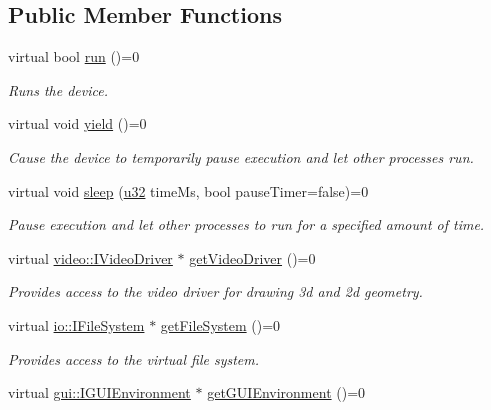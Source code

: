 \subsection*{Public Member Functions}
\begin{DoxyCompactItemize}
\item 
virtual bool \hyperlink{classirr_1_1IrrlichtDevice_a0489f8151dc43f6f41503ffb5a160b35}{run} ()=0
\begin{DoxyCompactList}\small\item\em Runs the device. \end{DoxyCompactList}\item 
virtual void \hyperlink{classirr_1_1IrrlichtDevice_a731727774fad9fc4c6c1c85277ca36dc}{yield} ()=0
\begin{DoxyCompactList}\small\item\em Cause the device to temporarily pause execution and let other processes run. \end{DoxyCompactList}\item 
virtual void \hyperlink{classirr_1_1IrrlichtDevice_a89a3ecebc0e7c5ae08617b78a6e8a9f7}{sleep} (\hyperlink{namespaceirr_a0416a53257075833e7002efd0a18e804}{u32} time\+Ms, bool pause\+Timer=false)=0
\begin{DoxyCompactList}\small\item\em Pause execution and let other processes to run for a specified amount of time. \end{DoxyCompactList}\item 
virtual \hyperlink{classirr_1_1video_1_1IVideoDriver}{video\+::\+I\+Video\+Driver} $\ast$ \hyperlink{classirr_1_1IrrlichtDevice_ada90707ba5c645d47e000e4e0f87c4c4}{get\+Video\+Driver} ()=0
\begin{DoxyCompactList}\small\item\em Provides access to the video driver for drawing 3d and 2d geometry. \end{DoxyCompactList}\item 
virtual \hyperlink{classirr_1_1io_1_1IFileSystem}{io\+::\+I\+File\+System} $\ast$ \hyperlink{classirr_1_1IrrlichtDevice_a3d8d2dee2f57aa7e6c0d14592de3e6ed}{get\+File\+System} ()=0
\begin{DoxyCompactList}\small\item\em Provides access to the virtual file system. \end{DoxyCompactList}\item 
virtual \hyperlink{classirr_1_1gui_1_1IGUIEnvironment}{gui\+::\+I\+G\+U\+I\+Environment} $\ast$ \hyperlink{classirr_1_1IrrlichtDevice_af7491b8c5ef4f71360f30fbad90ae35c}{get\+G\+U\+I\+Environment} ()=0

\end{DoxyCompactItemize}
